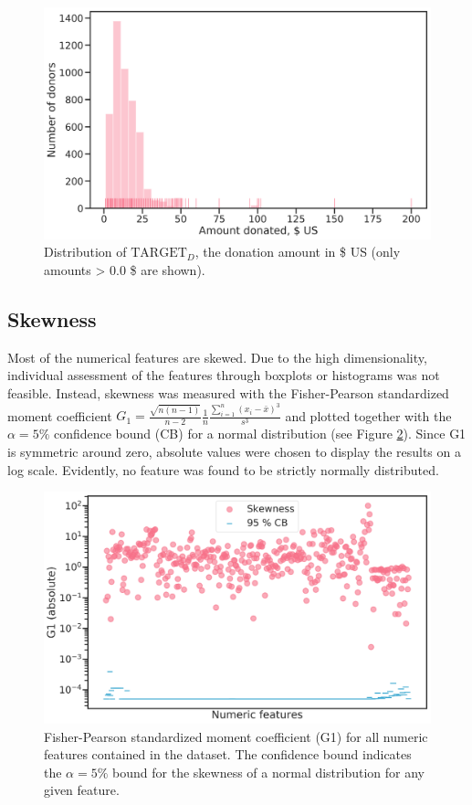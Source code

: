 \documentclass[
  11pt,
  a4paper,
  DIV=12,captions=tableheading,oneside,titlepage]{scrbook}
\begin{document}
\begin{figure}

{\centering \includegraphics[width=0.7\linewidth]{figures/eda/target-distribution} 

}

\caption{Distribution of \(\text{TARGET}_D\), the donation amount in \$ US (only amounts \textgreater{} 0.0 \$ are shown).}\label{fig:target-d-distrib}
\end{figure}

\hypertarget{skewness}{%
\subsection{Skewness}\label{skewness}}

Most of the numerical features are skewed. Due to the high dimensionality, individual assessment of the features through boxplots or histograms was not feasible. Instead, skewness was measured with the Fisher-Pearson standardized moment coefficient \(G_1 = \frac{\sqrt{n(n-1)}}{n-2} \frac{1}{n} \frac{\sum_{i=1}^n (x_i-\bar{x})^3}{s^3}\) and plotted together with the \(\alpha=5 \%\) confidence bound (CB) for a normal distribution (see Figure \ref{fig:skew-all}). Since G1 is symmetric around zero, absolute values were chosen to display the results on a log scale. Evidently, no feature was found to be strictly normally distributed.



\begin{figure}

{\centering \includegraphics[width=0.7\linewidth]{figures/eda/skewness-numeric-features} 

}

\caption{Fisher-Pearson standardized moment coefficient (G1) for all numeric features contained in the dataset. The confidence bound indicates the \(\alpha = 5 \%\) bound for the skewness of a normal distribution for any given feature.}\label{fig:skew-all}
\end{figure}
\end{document}
